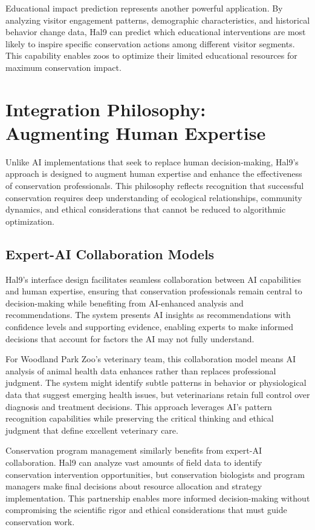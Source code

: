 \documentclass[
  Letterpaper,
]{scrbook}
\begin{document}
Educational impact prediction represents another powerful application.
By analyzing visitor engagement patterns, demographic characteristics,
and historical behavior change data, Hal9 can predict which educational
interventions are most likely to inspire specific conservation actions
among different visitor segments. This capability enables zoos to
optimize their limited educational resources for maximum conservation
impact.

\section{Integration Philosophy: Augmenting Human
Expertise}\label{integration-philosophy-augmenting-human-expertise}

Unlike AI implementations that seek to replace human decision-making,
Hal9's approach is designed to augment human expertise and enhance the
effectiveness of conservation professionals. This philosophy reflects
recognition that successful conservation requires deep understanding of
ecological relationships, community dynamics, and ethical considerations
that cannot be reduced to algorithmic optimization.

\subsection{Expert-AI Collaboration
Models}\label{expert-ai-collaboration-models}

Hal9's interface design facilitates seamless collaboration between AI
capabilities and human expertise, ensuring that conservation
professionals remain central to decision-making while benefiting from
AI-enhanced analysis and recommendations. The system presents AI
insights as recommendations with confidence levels and supporting
evidence, enabling experts to make informed decisions that account for
factors the AI may not fully understand.

For Woodland Park Zoo's veterinary team, this collaboration model means
AI analysis of animal health data enhances rather than replaces
professional judgment. The system might identify subtle patterns in
behavior or physiological data that suggest emerging health issues, but
veterinarians retain full control over diagnosis and treatment
decisions. This approach leverages AI's pattern recognition capabilities
while preserving the critical thinking and ethical judgment that define
excellent veterinary care.

Conservation program management similarly benefits from expert-AI
collaboration. Hal9 can analyze vast amounts of field data to identify
conservation intervention opportunities, but conservation biologists and
program managers make final decisions about resource allocation and
strategy implementation. This partnership enables more informed
decision-making without compromising the scientific rigor and ethical
considerations that must guide conservation work.
\end{document}
